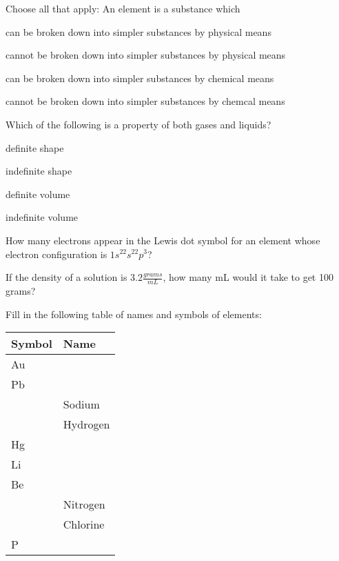 \documentclass[addpoints, 12pt]{exam}
\begin{document}
\begin{questions}


\question[4] Choose all that apply:  An element is a substance which
\begin{choices}
  \choice can be broken down into simpler substances by physical means

  \choice cannot be broken down into simpler substances by physical means

  \choice   can be broken down into simpler substances by chemical means

  \choice  cannot be broken down into simpler substances by chemcal means
  
\end{choices}

\question[4] Which of the following is a property of both gases and
liquids?
\begin{choices}
  \choice definite shape
 
 \choice indefinite shape

 \choice definite volume

 \choice indefinite volume
\end{choices}

\question[4] How many electrons appear in the Lewis dot symbol for an
element whose electron configuration is $1s^22s^22p^3$?

\begin{choices}




\end{choices}


\question[5]
If the density of a solution is $3.2 \frac{grams}{mL}$, how many mL would it take to get 100 grams?

\question[10]
Fill in the following table of names and symbols of elements:

\begin{tabular}{| l | l |}
\hline
Symbol & Name \\
\hline
Au & \\
Pb & \\
 & Sodium\\
 & Hydrogen\\
Hg & \\
Li & \\
Be & \\
 & Nitrogen \\
 & Chlorine \\
P & \\
\hline
\end{tabular}


\end{questions}
\end{document}
